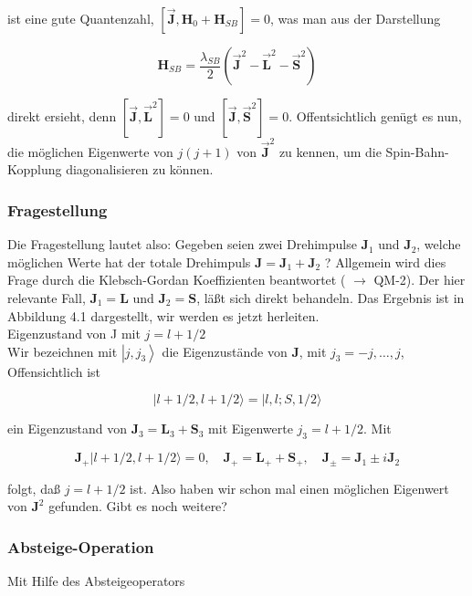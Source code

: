 \documentclass[10pt, letterpaper]{article}
\begin{document}
ist eine gute Quantenzahl, $\left[\overrightarrow{\mathbf{J}}, \mathbf{H}_{0}+\mathbf{H}_{S B}\right]=0$, was man aus der Darstellung

$$
\mathbf{H}_{S B}=\frac{\lambda_{S B}}{2}\left(\overrightarrow{\mathbf{J}}^{2}-\overrightarrow{\mathbf{L}}^{2}-\overrightarrow{\mathbf{S}}^{2}\right)
$$

direkt ersieht, denn $\left[\overrightarrow{\mathbf{J}}, \overrightarrow{\mathbf{L}}^{2}\right]=0$ und $\left[\overrightarrow{\mathbf{J}}, \overrightarrow{\mathbf{S}}^{2}\right]=0$. Offentsichtlich genügt es nun, die möglichen Eigenwerte von $j(j+1)$ von $\overrightarrow{\mathbf{J}}^{2}$ zu kennen, um die Spin-Bahn-Kopplung diagonalisieren zu können.

\subsubsection*{Fragestellung}
Die Fragestellung lautet also: Gegeben seien zwei Drehimpulse $\mathbf{J}_{1}$ und $\mathbf{J}_{2}$, welche möglichen Werte hat der totale Drehimpuls $\mathbf{J}=\mathbf{J}_{1}+\mathbf{J}_{2}$ ? Allgemein wird dies Frage durch die Klebsch-Gordan Koeffizienten beantwortet ( $\rightarrow$ QM-2). Der hier relevante Fall, $\mathbf{J}_{1}=\mathbf{L}$ und $\mathbf{J}_{2}=\mathbf{S}$, läßt sich direkt behandeln. Das Ergebnis ist in Abbildung 4.1 dargestellt, wir werden es jetzt herleiten.\\
Eigenzustand von J mit $j=l+1 / 2$\\
Wir bezeichnen mit $\left|j, j_{3}\right\rangle$ die Eigenzustände von $\mathbf{J}$, mit $j_{3}=-j, \ldots, j$, Offensichtlich ist

$$
|l+1 / 2, l+1 / 2\rangle=|l, l ; S, 1 / 2\rangle
$$

ein Eigenzustand von $\mathbf{J}_{3}=\mathbf{L}_{3}+\mathbf{S}_{3}$ mit Eigenwerte $j_{3}=l+1 / 2$. Mit

$$
\mathbf{J}_{+}|l+1 / 2, l+1 / 2\rangle=0, \quad \mathbf{J}_{+}=\mathbf{L}_{+}+\mathbf{S}_{+}, \quad \mathbf{J}_{ \pm}=\mathbf{J}_{1} \pm i \mathbf{J}_{2}
$$

folgt, daß $j=l+1 / 2$ ist. Also haben wir schon mal einen möglichen Eigenwert von $\mathbf{J}^{2}$ gefunden. Gibt es noch weitere?

\subsubsection*{Absteige-Operation}
Mit Hilfe des Absteigeoperators
\end{document}
